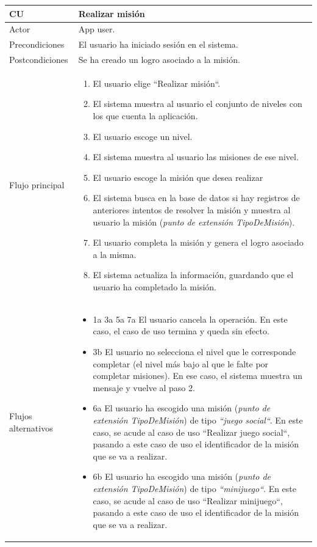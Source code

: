\documentclass[twoside]{report}
\newcommand\addrow[2]{#1 &#2\\ }
\newcommand\addheading[2]{#1 &#2\\ \hline}
\newcommand\tabularhead{\begin{tabular}{lp{0.7\textwidth}}
\hline
}
\newenvironment{usecase}{\tabularhead}
{\hline\end{tabular}}
\begin{document}
\begin{usecase}
  \addheading{\textbf{CU\arabic{usecase}}}{Realizar misión} 
  \addrow{Actor}{App user.}
  \addrow{Precondiciones}{El usuario ha iniciado sesión en el sistema.}
  \addrow{Postcondiciones}{Se ha creado un logro asociado a la misión.}
  \addrow{Flujo principal}{
  		\begin{enumerate}
  		\item El usuario elige “Realizar misión“. %
  		\item El sistema muestra al usuario el conjunto de niveles con los que cuenta la aplicación. %
  		\item El usuario escoge un nivel. %
  		\item El sistema muestra al usuario las misiones de ese nivel. %
  		\item El usuario escoge la misión que desea realizar %
  		\item El sistema busca en la base de datos si hay registros de anteriores intentos de resolver la misión y muestra al usuario la misión (\textit{punto de extensión TipoDeMisión}). %
  		\item El usuario completa la misión y genera el logro asociado a la misma.%
  		\item El sistema actualiza la información, guardando que el usuario ha completado la misión. %
  		\end{enumerate}
  }
  \addrow{Flujos alternativos}{
  		\begin{itemize}
  		\item 1a 3a 5a 7a El usuario cancela la operación. En este caso, el caso de uso termina y queda sin efecto.
        \item 3b El usuario no selecciona el nivel que le corresponde completar (el nivel más bajo al que le falte por completar misiones). En ese caso, el sistema muestra un mensaje y vuelve al paso 2.
        
        \item 6a El usuario ha escogido una misión (\textit{punto de extensión TipoDeMisión}) de tipo \textit{“juego social“}. En este caso, se acude al caso de uso “Realizar juego social“, pasando a este caso de uso el identificador de la misión que se va a realizar.
        
        \item 6b El usuario ha escogido una misión (\textit{punto de extensión TipoDeMisión}) de tipo \textit{“minijuego“}. En este caso, se acude al caso de uso “Realizar minijuego“, pasando a este caso de uso el identificador de la misión que se va a realizar.
        

\end{itemize}}
\end{usecase}
\end{document}
